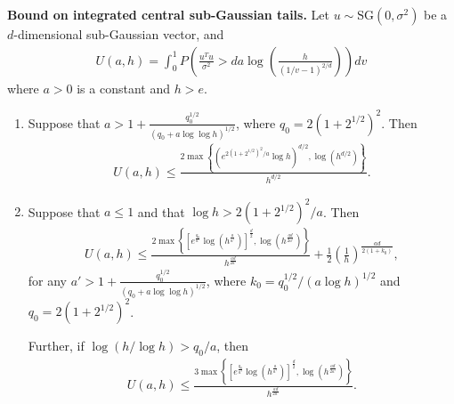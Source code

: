 \begin{prop} {\bf Bound on integrated central sub-Gaussian tails.}
Let $u \sim \mbox{SG}(0,\sigma^2)$ be a $d$-dimensional sub-Gaussian vector, and
\begin{align}
 U(a,h)= \int_0^1 P \left( \frac{u^Tu}{\sigma^2} > d a \log \left( \frac{h}{(1/v-1)^{2/d}} \right) \right) dv
\nonumber
\end{align}
where $a>0$ is a constant and $h > e$.
\begin{enumerate}[leftmargin=*,label=(\roman*)]
\item Suppose that $a > 1 + \frac{q_0^{1/2}}{(q_0 + a \log\log h)^{1/2}}$, where $q_0=2(1+2^{1/2})^2$. Then 
\begin{align}
 U(a,h) \leq \frac{2 \max \left\{ (e^{2(1+2^{1/2})^2/a} \log h)^{d/2}, \log(h^{d/2})\right\} }{h^{d/2}}.
\nonumber
\end{align}


\item Suppose that $a \leq 1$ and that $\log h > 2 (1+2^{1/2})^2/a$. Then
\begin{align}
 U(a,h) \leq \frac{2\max \left\{ [e^{\frac{q_0}{a'}} \log (h^{\frac{a}{a'}})]^{\frac{d}{2}}, \log (h^{\frac{ad}{2a'}}) \right\} }{h^{\frac{ad}{2a'}}}
+ \frac{1}{2} \left( \frac{1}{h} \right)^{\frac{ad}{2(1+k_0)}},
\nonumber
\end{align}
for any $a'>1 + \frac{q_0^{1/2}}{(q_0 + a \log\log h)^{1/2}}$, where $k_0= q_0^{1/2}/(a \log h)^{1/2}$ and $q_0=2(1+2^{1/2})^2$.


Further, if $\log \left( h/\log h \right) > q_0/a$, then
\begin{align}
 U(a,h) \leq \frac{3\max \left\{ [e^{\frac{q_0}{a'}} \log (h^{\frac{a}{a'}})]^{\frac{d}{2}}, \log (h^{\frac{ad}{2a'}}) \right\} }{h^{\frac{ad}{2a'}}}.
\nonumber
\end{align}

\end{enumerate}
\label{prop:intbound_sg_central}
\end{prop}


